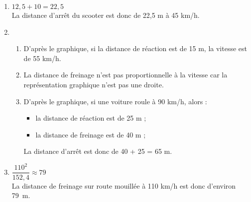 
\medskip

\begin{enumerate}
  \item $12,5 + 10 = 22,5$\\
  La distance d'arrêt du scooter est donc de 22,5 m à 45 km/h.
  \item
  \begin{enumerate}
    \item D'après le graphique, si la distance de réaction est de 15 m, la vitesse est de 55 km/h.
    \item La distance de freinage n'est pas proportionnelle à la vitesse car la représentation graphique n'est pas une droite.
    \item D'après le graphique, si une voiture roule à 90 km/h, alors :
    \begin{itemize}
      \item la distance de réaction est de 25 m ;
      \item la distance de freinage est de 40 m ;
    \end{itemize}
    La distance d'arrêt est donc de 40 + 25 = 65 m.
  \end{enumerate}
  \item $\dfrac{110^2}{152,4} \approx 79$\\
  La distance de freinage sur route mouillée à 110 km/h est donc d'environ 79~m.
\end{enumerate}

\medskip

